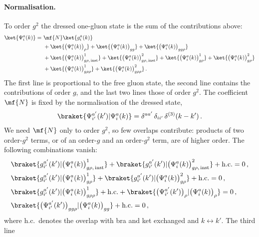 \paragraph{Normalisation.}
To order $g^{2}$ the dressed one-gluon state is the sum of the contributions above:
\begin{align}\label{Eq:intergluon}
\ket{\Psi^{a}_{i}(k)}=\ &\mf{N}\ket{g^{a}_{i}(k)}\notag\\
&+\ket{\big(\Psi^{a}_{i}(k)\big)_{\rho}}+\ket{\big(\Psi^{a}_{i}(k)\big)_{gg}}+\ket{\big(\Psi^{a}_{i}(k)\big)_{gg\rho}}\notag\\
&+\ket{\big(\Psi^{a}_{i}(k)\big)^{1}_{g\rho,\,{\rm inst}}}+\ket{\big(\Psi^{a}_{i}(k)\big)^{2}_{g\rho,\,{\rm inst}}}
+\ket{\big(\Psi^{a}_{i}(k)\big)^{1}_{g\rho}}+\ket{\big(\Psi^{a}_{i}(k)\big)^{2}_{g\rho}}\notag\\
&+\ket{\big(\Psi^{a}_{i}(k)\big)^{1}_{g\rho\rho}}+\ket{\big(\Psi^{a}_{i}(k)\big)^{2}_{g\rho\rho}}\,.
\end{align}
The first line is proportional to the free gluon state, the second line contains the contributions of
order $g$, and the last two lines those of order $g^{2}$. The coefficient $\mf{N}$ is fixed by the
normalisation of the dressed state,
\begin{align}
\braket{\Psi^{a'}_{i'}(k')|\Psi^{a}_{i}(k)}=\delta^{aa'}\,\delta_{ii'}\,\delta^{(3)}(k-k')\,.
\end{align}
We need $\mf{N}$ only to order $g^{2}$, so few overlaps contribute: products of two order-$g^{2}$ terms,
or of an order-$g$ and an order-$g^{2}$ term, are of higher order. The following combinations vanish:
\begin{align}
&\braket{g^{a'}_{i'}(k')|\big(\Psi^{a}_{i}(k)\big)^{1}_{g\rho,\,{\rm inst}}}
+\braket{g^{a'}_{i'}(k')|\big(\Psi^{a}_{i}(k)\big)^{2}_{g\rho,\,{\rm inst}}}+{\rm h.c.}=0\,,\notag\\
&\braket{g^{a'}_{i'}(k')|\big(\Psi^{a}_{i}(k)\big)^{1}_{g\rho}}
+\braket{g^{a'}_{i'}(k')|\big(\Psi^{a}_{i}(k)\big)^{2}_{g\rho}}+{\rm h.c.}=0\,,\notag\\
&\braket{g^{a'}_{i'}(k')|\big(\Psi^{a}_{i}(k)\big)^{1}_{g\rho\rho}}+{\rm h.c.}
+\braket{\big(\Psi^{a'}_{i'}(k')\big)_{\rho}|\big(\Psi^{a}_{i}(k)\big)_{\rho}}=0\,,\notag\\
&\braket{\big(\Psi^{a'}_{i'}(k')\big)_{gg\rho}|\big(\Psi^{a}_{i}(k)\big)_{gg}}+{\rm h.c.}=0\,,
\end{align}
where h.c.\ denotes the overlap with bra and ket exchanged and $k\leftrightarrow k'$. The third line
